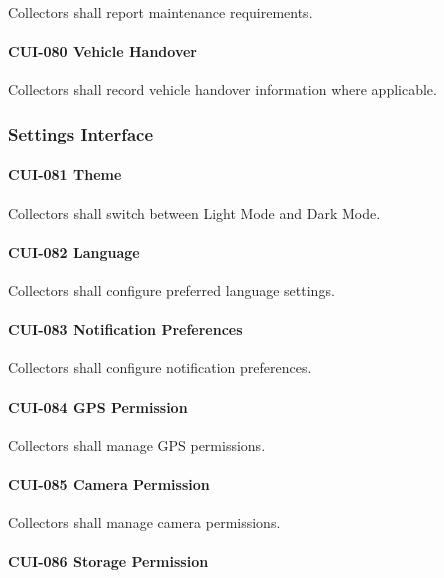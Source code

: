 Collectors shall report maintenance requirements.

\paragraph{CUI-080 Vehicle Handover}

Collectors shall record vehicle handover information where applicable.


\subsubsection*{Settings Interface}

\paragraph{CUI-081 Theme}

Collectors shall switch between Light Mode and Dark Mode.

\paragraph{CUI-082 Language}

Collectors shall configure preferred language settings.

\paragraph{CUI-083 Notification Preferences}

Collectors shall configure notification preferences.

\paragraph{CUI-084 GPS Permission}

Collectors shall manage GPS permissions.

\paragraph{CUI-085 Camera Permission}

Collectors shall manage camera permissions.

\paragraph{CUI-086 Storage Permission}

